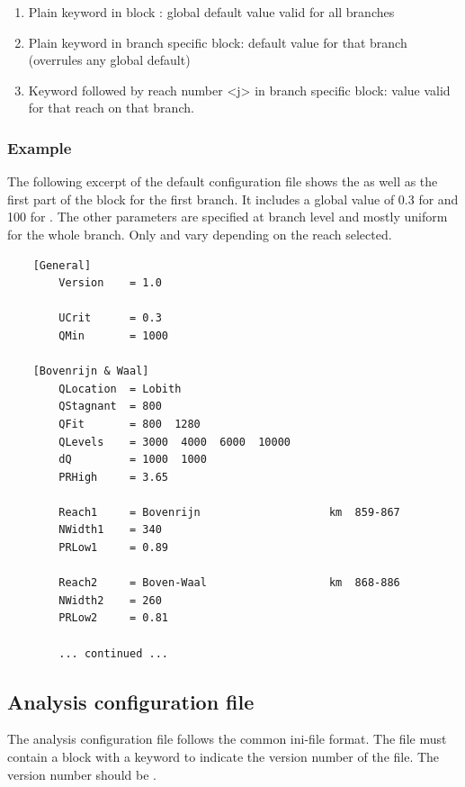 \begin{enumerate}
\item Plain keyword in block \keyw{[General]}: global default value valid for all branches
\item Plain keyword in branch specific block: default value for that branch (overrules any global default)
\item Keyword followed by reach number <j> in branch specific block: value valid for that reach on that branch.
\end{enumerate}

\subsubsection*{Example}

The following excerpt of the default  configuration file shows the \keyw{[General]} as well as the first part of the  block for the first branch.
It includes a global value of 0.3 for  and 100 for .
The other parameters are specified at branch level and mostly uniform for the whole branch.
Only  and  vary depending on the reach selected.

\begin{Verbatim}
    [General]
        Version    = 1.0

        UCrit      = 0.3
        QMin       = 1000

    [Bovenrijn & Waal]
        QLocation  = Lobith
        QStagnant  = 800
        QFit       = 800  1280
        QLevels    = 3000  4000  6000  10000
        dQ         = 1000  1000
        PRHigh     = 3.65
        
        Reach1     = Bovenrijn                    km  859-867
        NWidth1    = 340
        PRLow1     = 0.89
        
        Reach2     = Boven-Waal                   km  868-886
        NWidth2    = 260
        PRLow2     = 0.81

        ... continued ...
\end{Verbatim}

\subsection{Analysis configuration file}\label{app-v1:config}

The analysis configuration file follows the common ini-file format.
The file must contain a \keyw{[General]} block with a keyword  to indicate the version number of the file.
The version number should be .


